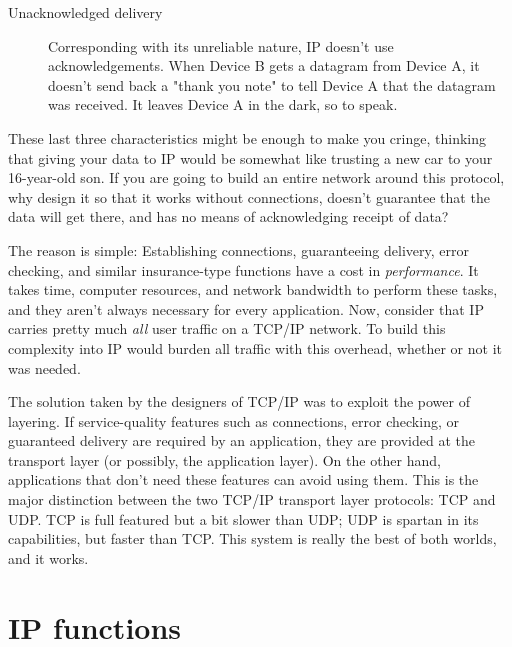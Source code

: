 \documentclass[b5paper,11pt]{memoir}
\begin{document}
\begin{description}
   \item[Unacknowledged delivery]
      Corresponding with its unreliable nature, IP doesn't use acknowledgements.
      When Device B gets a datagram from Device A, it doesn't send back a "thank you note" to tell Device A that the datagram was received.
      It leaves Device A in the dark, so to speak.
\end{description}

These last three characteristics might be enough to make you cringe,
thinking that giving your data to IP would be somewhat like trusting a
new car to your 16-year-old son. If you are going to build an entire
network around this protocol, why design it so that it works without
connections, doesn't guarantee that the data will get there, and has no
means of acknowledging receipt of data?

The reason is simple: Establishing connections, guaranteeing delivery,
error checking, and similar insurance-type
\protect\hypertarget{ch15.htmlux5cux23idx-CHP-15-0640}{}{}functions have
a cost in {\emph{performance}}. It takes time, computer resources, and
network bandwidth to perform these tasks, and they aren't always
necessary for every application. Now, consider that IP carries pretty
much {\emph{all}} user traffic on a TCP/IP network. To build this
complexity into IP would burden all traffic with this overhead, whether
or not it was needed.

The solution taken by the designers of TCP/IP was to exploit the power
of layering. If service-quality features such as connections, error
checking, or guaranteed delivery are required by an application, they
are provided at the transport layer (or possibly, the application
layer). On the other hand, applications that don't need these features
can avoid using them. This is the major distinction between the two
TCP/IP transport layer protocols: TCP and UDP. TCP is full featured but
a bit slower than UDP; UDP is spartan in its capabilities, but faster
than TCP. This system is really the best of both worlds, and it works.



\section{IP functions}
\end{document}
